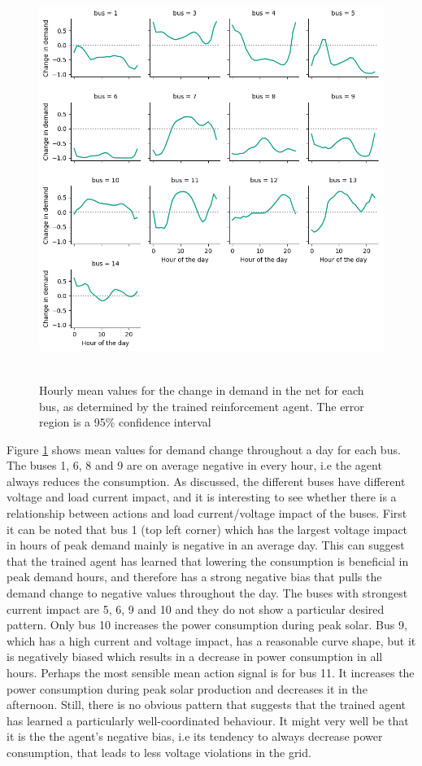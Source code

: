\documentclass[class=book, crop=false]{standalone}
\begin{document}
\begin{figure}[h]
    \center
\includegraphics[height=13cm, width=12cm]{figures/config1_action_bus.png}
    \caption[size = 9]{Hourly mean values for the change in demand in the net for each bus, as determined by the trained reinforcement agent. The error region is a 95\% confidence interval}
    \label{fig:discussion:config1_action_bus}
\end{figure}

Figure \ref{fig:discussion:config1_action_bus} shows mean values for demand change throughout a day for each bus.  The buses 1, 6, 8 and 9 are on average negative in every hour, i.e the agent always reduces the consumption. As discussed, the different buses have different voltage and load current impact, and it is interesting to see whether there is a relationship between actions and load current/voltage impact of the buses. First it can be noted that bus 1 (top left corner) which has the largest voltage impact in hours of peak demand mainly is negative in an average day. This can suggest that the trained agent has learned that lowering the consumption is beneficial in peak demand hours, and therefore has a strong negative bias that pulls the demand change to negative values throughout the day. The buses with strongest current impact are 5, 6, 9 and 10 and they do not show a particular desired pattern. Only bus 10 increases the power consumption during peak solar. Bus 9, which has a high current and voltage impact, has a reasonable curve shape, but it is negatively biased which results in a decrease in power consumption in all hours. Perhaps the most sensible mean action signal is for bus 11. It increases the power consumption during peak solar production and decreases it in the afternoon. Still, there is no obvious pattern that suggests that the trained agent has learned a particularly well-coordinated behaviour. It might very well be that it is the the agent's negative bias, i.e its tendency to always decrease power consumption, that leads to less voltage violations in the grid.
\end{document}

